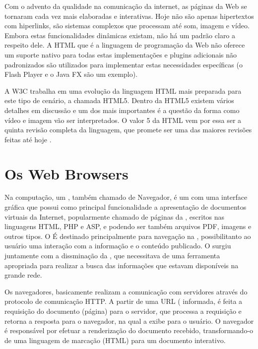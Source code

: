 \documentclass[espaco=simples,appendix=Name]{abnt}
\begin{document}
\begin{description}
Com o advento da qualidade na comunicação da internet, as páginas da Web se tornaram cada vez mais elaboradas e interativas. Hoje não são apenas hipertextos com hiperlinks, são sistemas complexos que processam até som, imagem e vídeo. Embora estas funcionalidades dinâmicas existam, não há um padrão claro a respeito dele. A HTML que é a linguagem de programação da Web não oferece um suporte nativo para todas estas implementações e plugins adicionais não padronizados são utilizados para implementar estas necessidades específicas (o Flash Player e o Java FX são um exemplo).

A W3C trabalha em uma evolução da linguagem HTML mais preparada para este tipo de cenário, a chamada HTML5. Dentro da HTML5 existem vários detalhes em discussão e um dos mais importantes é a questão da forma como vídeo e imagem vão ser interpretados. O valor 5 da HTML vem por essa ser a quinta revisão completa da linguagem, que promete ser uma das maiores revisões feitas até hoje \cite{HTML5spec}.

\section{Os Web Browsers}

\item \noindent
Na computação, um , também chamado de Navegador, é um  com uma interface gráfica que possui como principal funcionalidade a apresentação de documentos virtuais da Internet, popularmente chamado de páginas da , escritos nas linguagens HTML, PHP e ASP, e podendo ser também arquivos PDF, imagens e outros tipos. O  É destinado principalmente para navegação na , possibilitanto ao usuário uma interação com a informação e o conteúdo publicado. O  surgiu juntamente com a dissminação da , que necessitava de uma ferramenta apropriada para realizar a busca das informações que estavam disponíveis na grande rede. \cite{ArchitectureWebBrowsers}

Os navegadores, basicamente realizam a comunicação com servidores  através do protocolo de comunicação HTTP. A partir de uma URL ( informada, é feita a requisição do documento (página) para o servidor, que processa a requisição e retorna a resposta para o navegador, na qual a exibe para o usuário. O navegador é responsável por efetuar a renderização do documento recebido, transformando-o de uma linguagem de marcação (HTML) para um documento interativo.\cite{ArchitectureWebBrowsers}


\end{description}
\end{document}

